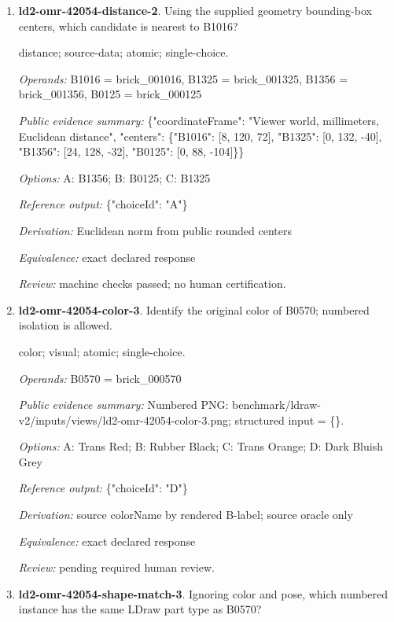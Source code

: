 \begin{enumerate}
\item \textbf{ld2-omr-42054-distance-2}. Using the supplied geometry bounding-box centers, which candidate is nearest to B1016?
\par{\small distance; source-data; atomic; single-choice.\par\textit{Operands:} B1016 = brick\_001016, B1325 = brick\_001325, B1356 = brick\_001356, B0125 = brick\_000125\par\textit{Public evidence summary:} \{"coordinateFrame": "Viewer world, millimeters, Euclidean distance", "centers": \{"B1016": [8, 120, 72], "B1325": [0, 132, -40], "B1356": [24, 128, -32], "B0125": [0, 88, -104]\}\}\par\textit{Options:} A: B1356; B: B0125; C: B1325\par\textit{Reference output:} \{"choiceId": "A"\}\par\textit{Derivation:} Euclidean norm from public rounded centers\par\textit{Equivalence:} exact declared response\par\textit{Review:} machine checks passed; no human certification.}
\item \textbf{ld2-omr-42054-color-3}. Identify the original color of B0570; numbered isolation is allowed.
\par{\small color; visual; atomic; single-choice.\par\textit{Operands:} B0570 = brick\_000570\par\textit{Public evidence summary:} Numbered PNG: benchmark/ldraw-v2/inputs/views/ld2-omr-42054-color-3.png; structured input = \{\}.\par\textit{Options:} A: Trans Red; B: Rubber Black; C: Trans Orange; D: Dark Bluish Grey\par\textit{Reference output:} \{"choiceId": "D"\}\par\textit{Derivation:} source colorName by rendered B-label; source oracle only\par\textit{Equivalence:} exact declared response\par\textit{Review:} pending required human review.}
\item \textbf{ld2-omr-42054-shape-match-3}. Ignoring color and pose, which numbered instance has the same LDraw part type as B0570?

\end{enumerate}
